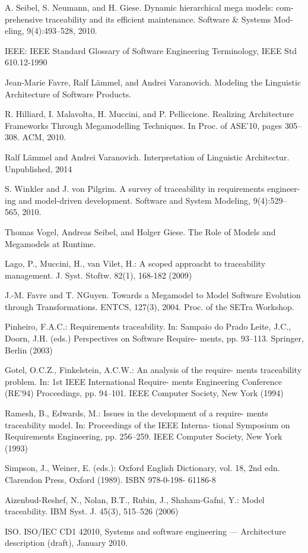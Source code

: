 \begin{thebibliography}{1}

A. Seibel, S. Neumann, and H. Giese. Dynamic hierarchical mega models: com- prehensive traceability and its efficient maintenance. Software \& Systems Mod- eling, 9(4):493–528, 2010.

IEEE: IEEE Standard Glossary of Software Engineering Terminology, IEEE Std 610.12-1990

Jean-Marie Favre, Ralf Lämmel, and Andrei Varanovich. Modeling the Linguistic Architecture of Software Products.

R. Hilliard, I. Malavolta, H. Muccini, and P. Pelliccione. Realizing Architecture Frameworks Through Megamodelling Techniques. In Proc. of ASE’10, pages 305–308. ACM, 2010.

Ralf Lämmel and Andrei Varanovich. Interpretation of Linguistic Architectur. Unpublished, 2014

S. Winkler and J. von Pilgrim. A survey of traceability in requirements engineer- ing and model-driven development. Software and System Modeling, 9(4):529– 565, 2010. 

Thomas Vogel, Andreas Seibel, and Holger Giese. The Role of Models and Megamodels at Runtime.

Lago, P., Muccini, H., van Vilet, H.: A scoped approacht to traceability management. J. Syst. Stoftw. 82(1), 168-182 (2009)

J.-M. Favre and T. NGuyen. Towards a Megamodel to Model Software Evolution through Transformations. ENTCS, 127(3), 2004. Proc. of the SETra Workshop.

Pinheiro, F.A.C.: Requirements traceability. In: Sampaio do Prado
Leite, J.C., Doorn, J.H. (eds.) Perspectives on Software Require-
ments, pp. 93–113. Springer, Berlin (2003)

Gotel, O.C.Z., Finkelstein, A.C.W.: An analysis of the require-
ments traceability problem. In: 1st IEEE International Require-
ments Engineering Conference (RE’94) Proceedings, pp. 94–101.
IEEE Computer Society, New York (1994)

Ramesh, B., Edwards, M.: Issues in the development of a require-
ments traceability model. In: Proceedings of the IEEE Interna-
tional Symposium on Requirements Engineering, pp. 256–259.
IEEE Computer Society, New York (1993)

Simpson, J., Weiner, E. (eds.): Oxford English Dictionary, vol. 18,
2nd edn. Clarendon Press, Oxford (1989). ISBN 978-0-198-
61186-8

Aizenbud-Reshef, N., Nolan, B.T., Rubin, J., Shaham-Gafni, Y.:
Model traceability. IBM Syst. J. 45(3), 515–526 (2006)

ISO. ISO/IEC CD1 42010, Systems and software engineering
— Architecture description (draft), January 2010.

\end{thebibliography}